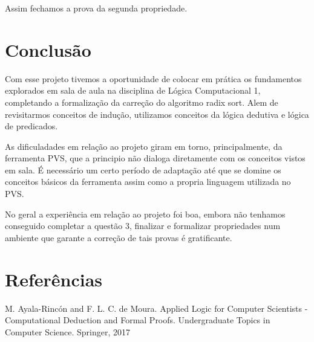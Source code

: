 \documentclass[a4paper, 12pt]{article}
\begin{document}
Assim fechamos a prova da segunda propriedade.

\section{Conclusão}
Com esse projeto tivemos a oportunidade de colocar em prática os fundamentos explorados em sala de aula na disciplina de Lógica Computacional 1, completando a formalização da carreção do algoritmo radix sort.
Alem de revisitarmos conceitos de indução, utilizamos conceitos da lógica dedutiva e lógica de predicados.

As dificuladades em relação ao projeto giram em torno, principalmente, da ferramenta PVS, que a principio não dialoga diretamente com os conceitos vistos em sala. É necessário um certo período de adaptação até que se domine os conceitos básicos da ferramenta assim como a propria linguagem utilizada no PVS.

No geral a experiência em relação ao projeto foi boa, embora não tenhamos conseguido completar a questão 3, finalizar e formalizar propriedades num ambiente que garante a correção de tais provas é gratificante.

\section{Referências}
M. Ayala-Rincón and F. L. C. de Moura. Applied Logic for Computer Scientists - Computational
Deduction and Formal Proofs. Undergraduate Topics in Computer Science.
Springer, 2017


\vspace{50pt}
\end{document}
